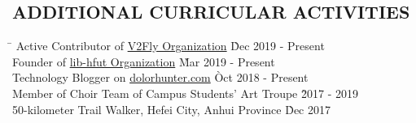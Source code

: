 \documentclass{res}
\begin{document}
\begin{resume}
\vspace{-0.12in}	    
\section{ADDITIONAL CURRICULAR ACTIVITIES}
    \vspace{-0.1in}	
    \begin{tabbing}
    \hspace{5in}\= \kill %
    Active Contributor of \href{https://github.com/v2fly}{V2Fly Organization} \` Dec 2019 - Present \\ 
    Founder of \href{https://github.com/lib-hfut}{lib-hfut Organization} \` Mar 2019 - Present \\  
    Technology Blogger on \href{https://dolorhunter.com}{dolorhunter.com} \` Oct 2018 - Present \\
    Member of Choir Team of Campus Students' Art Troupe \` 2017 - 2019 \\
    50-kilometer Trail Walker, Hefei City, Anhui Province \` Dec 2017  
    \end{tabbing}\vspace{-20pt}      %

\end{resume}
\end{document}
